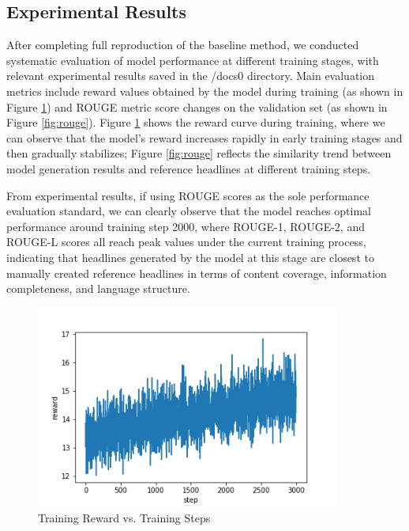 \documentclass[10pt,a4paper]{article}
\begin{document}
\subsection{Experimental Results}
After completing full reproduction of the baseline method, we conducted systematic evaluation of model performance at different training stages, with relevant experimental results saved in the /docs0 directory. Main evaluation metrics include reward values obtained by the model during training (as shown in Figure \ref{fig:reward}) and ROUGE metric score changes on the validation set (as shown in Figure \ref{fig:rouge}). Figure \ref{fig:reward} shows the reward curve during training, where we can observe that the model's reward increases rapidly in early training stages and then gradually stabilizes; Figure \ref{fig:rouge} reflects the similarity trend between model generation results and reference headlines at different training steps.

From experimental results, if using ROUGE scores as the sole performance evaluation standard, we can clearly observe that the model reaches optimal performance around training step 2000, where ROUGE-1, ROUGE-2, and ROUGE-L scores all reach peak values under the current training process, indicating that headlines generated by the model at this stage are closest to manually created reference headlines in terms of content coverage, information completeness, and language structure.

\begin{figure}[H]
  \centering
  \includegraphics[width=10cm]{fig/reward.png}
  \caption{Training Reward vs. Training Steps}\label{fig:reward}
\end{figure}
\end{document}
